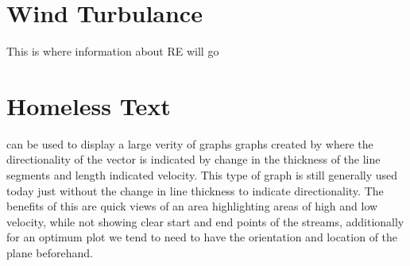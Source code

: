 \section{Wind Turbulance}

This is where information about RE will go

\section{Homeless Text}
can be used to display a large verity of graphs graphs created by {} where the directionality of the vector is indicated by change in the thickness of the line segments and length indicated velocity. This type of graph is still generally used today just without the change in line thickness to indicate  directionality. \cite{567777} The benefits of this are quick views of an area highlighting areas of high and low velocity, while not showing clear start and end points of the streams, additionally for an optimum plot we tend to need to have the orientation and location of the plane beforehand. 



